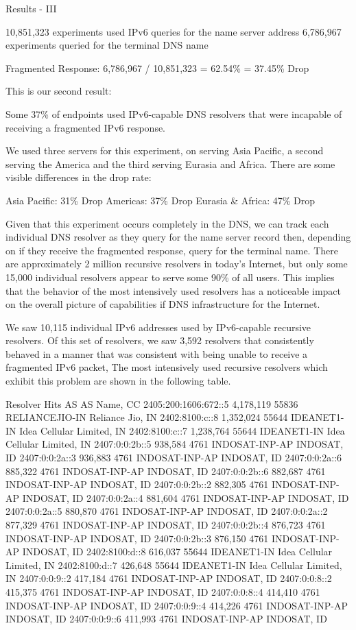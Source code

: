 Results - III 

10,851,323 experiments used IPv6 queries for the name server address
 6,786,967 experiments queried for the terminal DNS name

Fragmented Response: 6,786,967 / 10,851,323 = 62.54\% = 37.45\% Drop

This is our second result:

Some 37\% of endpoints used IPv6-capable DNS resolvers that were incapable of receiving a fragmented IPv6 response.

We used three servers for this experiment, on serving Asia Pacific, a second serving the America and the third serving Eurasia and Africa. There are some visible differences in the drop rate:

Asia Pacific: 31\% Drop
Americas: 37\% Drop
Eurasia & Africa: 47\% Drop

Given that this experiment occurs completely in the DNS, we can track each individual DNS resolver as they query for the name server record then, depending on if they receive the fragmented response, query for the terminal name. There are approximately 2 million recursive resolvers in today’s Internet, but only some 15,000 individual resolvers appear to serve some 90\% of all users. This implies that the behavior of the most intensively used resolvers has a noticeable impact on the overall picture of capabilities if DNS infrastructure for the Internet.

We saw 10,115 individual IPv6 addresses used by IPv6-capable recursive resolvers. Of this set of resolvers, we saw 3,592 resolvers that consistently behaved in a manner that was consistent with being unable to receive a fragmented IPv6 packet, The most intensively used recursive resolvers which exhibit this problem are shown in the following table.

Resolver Hits  AS AS Name, CC
2405:200:1606:672::5    4,178,119      55836 RELIANCEJIO-IN Reliance Jio, IN
2402:8100:c::8 1,352,024   55644 IDEANET1-IN Idea Cellular Limited, IN
2402:8100:c::7 1,238,764   55644 IDEANET1-IN Idea Cellular Limited, IN
2407:0:0:2b::5 938,584  4761  INDOSAT-INP-AP INDOSAT, ID
2407:0:0:2a::3 936,883  4761  INDOSAT-INP-AP INDOSAT, ID
2407:0:0:2a::6 885,322  4761  INDOSAT-INP-AP INDOSAT, ID
2407:0:0:2b::6 882,687  4761  INDOSAT-INP-AP INDOSAT, ID
2407:0:0:2b::2 882,305  4761  INDOSAT-INP-AP INDOSAT, ID
2407:0:0:2a::4 881,604  4761  INDOSAT-INP-AP INDOSAT, ID
2407:0:0:2a::5 880,870  4761  INDOSAT-INP-AP INDOSAT, ID
2407:0:0:2a::2 877,329  4761  INDOSAT-INP-AP INDOSAT, ID
2407:0:0:2b::4 876,723  4761  INDOSAT-INP-AP INDOSAT, ID
2407:0:0:2b::3 876,150  4761  INDOSAT-INP-AP INDOSAT, ID
2402:8100:d::8 616,037  55644 IDEANET1-IN Idea Cellular Limited, IN
2402:8100:d::7 426,648  55644 IDEANET1-IN Idea Cellular Limited, IN
2407:0:0:9::2  417,184  4761  INDOSAT-INP-AP INDOSAT, ID
2407:0:0:8::2  415,375  4761  INDOSAT-INP-AP INDOSAT, ID
2407:0:0:8::4  414,410  4761  INDOSAT-INP-AP INDOSAT, ID
2407:0:0:9::4  414,226  4761  INDOSAT-INP-AP INDOSAT, ID
2407:0:0:9::6  411,993  4761  INDOSAT-INP-AP INDOSAT, ID

